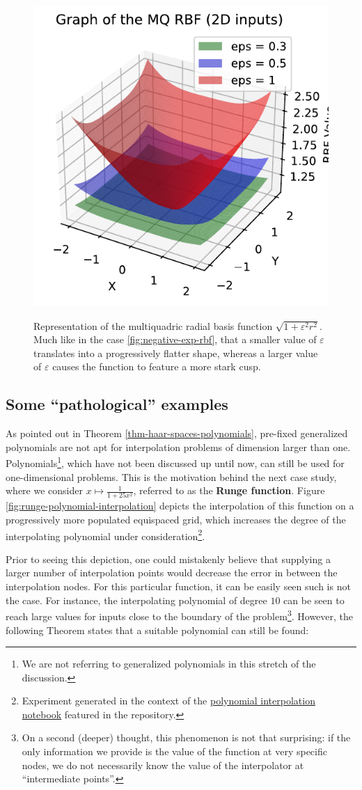 \documentclass[12pt]{report} %
\newcommand{\tmstrong}[1]{\textbf{#1}}
\begin{document}
\begin{figure}[ht]
  \centering
  {\includegraphics[width=.5\textwidth, clip=true, trim={0 0 .17cm 0}]{imagenes/rbf_discussion/mq-rbf.pdf}}
  \caption{Representation of the multiquadric radial basis function $\sqrt{1+\varepsilon^2 r^2}$. Much like in the case \ref{fig:negative-exp-rbf}, that a smaller value of $\varepsilon$ translates into a progressively flatter shape, whereas a larger value of $\varepsilon$ causes the function to feature a more stark cusp.}
  \label{fig:mq-rbf}
\end{figure}

\subsection*{Some ``pathological'' examples}

As pointed out in Theorem \ref{thm-haar-spaces-polynomials}, pre-fixed
generalized polynomials are not apt for interpolation problems of
dimension larger than one. Polynomials\footnote{We are not referring to generalized polynomials in this stretch of the discussion.}, which
have not been discussed up until now, can still be used for one-dimensional
problems. This is the motivation behind the next case study, where we consider
$x \mapsto \frac{1}{1 + 25 x^2}$, referred to as the {\tmstrong{Runge
      function}}. Figure \ref{fig:runge-polynomial-interpolation} depicts the
interpolation of this function on a progressively more populated equispaced
grid, which increases the degree of the interpolating polynomial under consideration\footnote{Experiment generated in the context of the \href{https://github.com/heqro/tfm-experiments/blob/main/introductory_notebooks/polynomial_interpolation/runge.ipynb}{polynomial interpolation notebook} featured in the repository.}.

Prior to seeing this depiction, one could mistakenly believe that supplying a larger number of interpolation points would decrease the error in between the interpolation nodes. For this particular function, it can be easily seen such is not the case. For instance, the interpolating polynomial of degree $10$ can be seen to reach large values for inputs close to the boundary of the problem\footnote{On a second (deeper) thought, this phenomenon is not that surprising: if the only information we provide is the value of the function at very specific nodes, we do not necessarily know the value of the interpolator at ``intermediate points''.}. However, the following Theorem states that a suitable polynomial can still be found:
\end{document}
